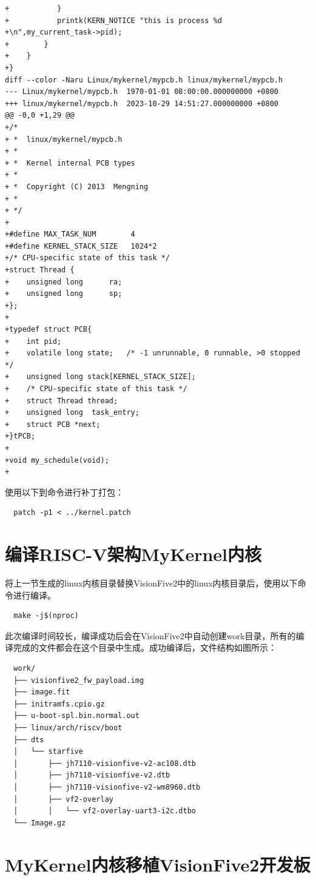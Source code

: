 \documentclass[lang=cn,10pt]{elegantbook}
\begin{document}
\begin{lstlisting}
+        	}
+        	printk(KERN_NOTICE "this is process %d +\n",my_current_task->pid);
+        }
+    }
+}
diff --color -Naru Linux/mykernel/mypcb.h linux/mykernel/mypcb.h
--- Linux/mykernel/mypcb.h	1970-01-01 08:00:00.000000000 +0800
+++ linux/mykernel/mypcb.h	2023-10-29 14:51:27.000000000 +0800
@@ -0,0 +1,29 @@
+/*
+ *  linux/mykernel/mypcb.h
+ *
+ *  Kernel internal PCB types
+ *
+ *  Copyright (C) 2013  Mengning
+ *
+ */
+
+#define MAX_TASK_NUM        4
+#define KERNEL_STACK_SIZE   1024*2
+/* CPU-specific state of this task */
+struct Thread {
+    unsigned long		ra;
+    unsigned long		sp;
+};
+
+typedef struct PCB{
+    int pid;
+    volatile long state;	/* -1 unrunnable, 0 runnable, >0 stopped */
+    unsigned long stack[KERNEL_STACK_SIZE];
+    /* CPU-specific state of this task */
+    struct Thread thread;
+    unsigned long	task_entry;
+    struct PCB *next;
+}tPCB;
+
+void my_schedule(void);
+
\end{lstlisting}

使用以下到命令进行补丁打包：
\begin{lstlisting}
  patch -p1 < ../kernel.patch  
\end{lstlisting}

\section{编译RISC-V架构MyKernel内核}
将上一节生成的linux内核目录替换VisionFive2中的linux内核目录后，使用以下命令进行编译。

\begin{lstlisting}
  make -j$(nproc)
\end{lstlisting}

此次编译时间较长，编译成功后会在VisionFive2中自动创建work目录，所有的编译完成的文件都会在这个目录中生成。成功编译后，文件结构如图所示：

\begin{lstlisting}
  work/
  ├── visionfive2_fw_payload.img
  ├── image.fit
  ├── initramfs.cpio.gz
  ├── u-boot-spl.bin.normal.out
  ├── linux/arch/riscv/boot
  ├── dts
  │   └── starfive
  │       ├── jh7110-visionfive-v2-ac108.dtb
  │       ├── jh7110-visionfive-v2.dtb
  │       ├── jh7110-visionfive-v2-wm8960.dtb
  │       ├── vf2-overlay
  │       │   └── vf2-overlay-uart3-i2c.dtbo
  └── Image.gz
\end{lstlisting}

\section{MyKernel内核移植VisionFive2开发板}
\end{document}
